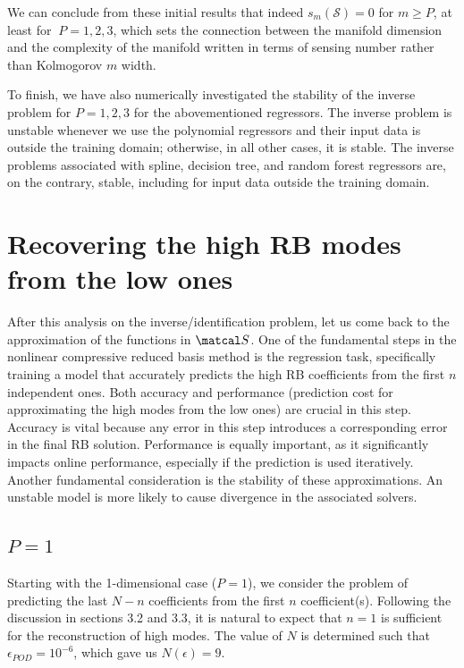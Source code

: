 \documentclass[graybox]{svmult}
\begin{document}
We can conclude from these initial results that indeed $s_m({\mathcal S}) = 0$ for $m \geq P$, at least for $\ P=1,2,3$, which sets the connection between the manifold dimension and the complexity of the manifold written in terms of sensing number rather than Kolmogorov $m$ width.

To finish, we have also numerically investigated the stability of the inverse problem for $P=1,2,3$ for the abovementioned regressors. The inverse problem is unstable whenever we use the polynomial regressors and their input data is outside the training domain; otherwise, in all other cases, it is stable. The inverse problems associated with spline, decision tree, and random forest regressors are, on the contrary, stable, including for input data outside the training domain. 

\section{Recovering the high RB modes from the low ones}
\label{sec:4}
After this analysis on the inverse/identification problem, let us come back to the approximation of the functions in ${\matcal S}$. One of the fundamental steps in the nonlinear compressive reduced basis method is the regression task, specifically training a model that accurately predicts the high RB coefficients from the first $n$ independent ones. Both accuracy and performance (prediction cost for approximating the high modes from the low ones) are crucial in this step. Accuracy is vital because any error in this step introduces a corresponding error in the final RB solution. Performance is 
equally important, as it significantly impacts online performance, especially if the prediction is used iteratively. Another fundamental consideration is the stability of these approximations. An unstable model is more likely to cause divergence in the associated solvers.


\subsection{$P=1$}
\label{subsec:4.1}
Starting with the 1-dimensional case ($P=1$), we consider the problem of predicting the last $N-n$ coefficients from the first $n$ coefficient(s). Following the discussion in sections 3.2 and 3.3, it is natural to expect that $n=1$ is sufficient for the reconstruction of high modes. The value of $N$ is determined such that $\epsilon_{POD} = 10^{-6}$, which gave us $N(\epsilon) = 9$.
\end{document}
